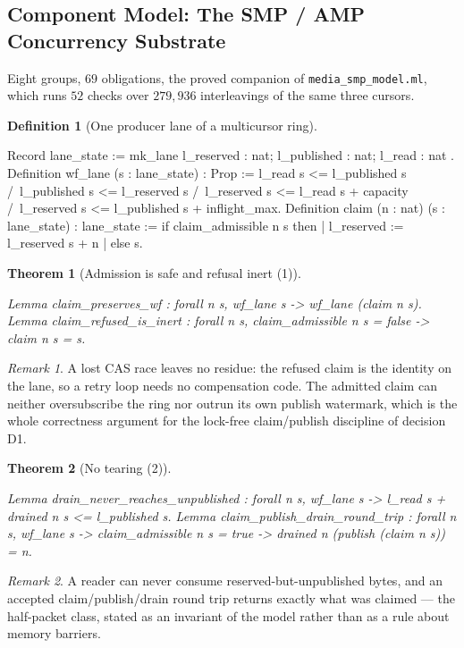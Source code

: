 \documentclass[10pt,journal,compsoc,twocolumn]{article}
\newtheorem{theorem}{Theorem}[section]
\theoremstyle{definition}
\newtheorem{definition}{Definition}[section]
\theoremstyle{remark}
\newtheorem{remark}{Remark}[section]
\theoremstyle{plain}
\newcommand{\ctr}[1]{\texttt{#1}}
\begin{document}
\subsection{Component Model: The SMP / AMP Concurrency Substrate}
\label{sec:acct:smp}

Eight groups, \(69\) obligations, the proved companion of
\ctr{media\_smp\_model.ml}, which runs \(52\) checks over \(279{,}936\)
interleavings of the same three cursors.

\begin{definition}[One producer lane of a multicursor ring]
\label{def:acct:lane}
\begin{coc}
Record lane_state := mk_lane { l_reserved : nat; l_published : nat; l_read : nat }.
Definition wf_lane (s : lane_state) : Prop :=
  l_read s <= l_published s /\ l_published s <= l_reserved s /\
  l_reserved s <= l_read s + capacity /\ l_reserved s <= l_published s + inflight_max.
Definition claim (n : nat) (s : lane_state) : lane_state :=
  if claim_admissible n s then {| l_reserved := l_reserved s + n |} else s.
\end{coc}\end{definition}
\begin{theorem}[Admission is safe and refusal inert (1)]
\begin{coc}
Lemma claim_preserves_wf : forall n s, wf_lane s -> wf_lane (claim n s).
Lemma claim_refused_is_inert : forall n s, claim_admissible n s = false -> claim n s = s.
\end{coc}\end{theorem}
\begin{remark}
A lost CAS race leaves no residue: the refused claim is the identity on the
lane, so a retry loop needs no compensation code. The admitted claim can neither
oversubscribe the ring nor outrun its own publish watermark, which is the whole
correctness argument for the lock-free claim/publish discipline of decision D1.
\end{remark}

\begin{theorem}[No tearing (2)]
\begin{coc}
Lemma drain_never_reaches_unpublished : forall n s, wf_lane s ->
  l_read s + drained n s <= l_published s.
Lemma claim_publish_drain_round_trip : forall n s, wf_lane s ->
  claim_admissible n s = true -> drained n (publish (claim n s)) = n.
\end{coc}\end{theorem}
\begin{remark}
A reader can never consume reserved-but-unpublished bytes, and an accepted
claim/publish/drain round trip returns exactly what was claimed --- the
half-packet class, stated as an invariant of the model rather than as a rule
about memory barriers.
\end{remark}
\end{document}
